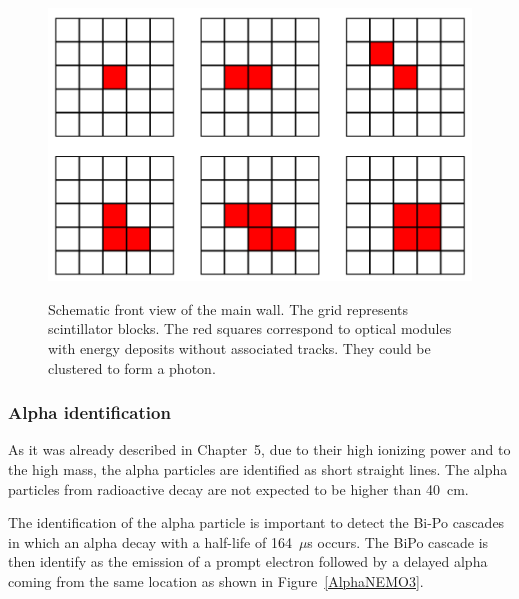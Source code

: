 \documentclass[main.tex]{subfiles}
\begin{document}
\begin{figure}[h!]
\centering
\includegraphics[scale=0.35]{pictures/Chap6/GammaCluster.png}
\label{GammaClusterSchema}
\caption{Schematic front view of the main wall. The grid represents scintillator blocks. The red squares correspond to optical modules with energy deposits without associated tracks. They could be clustered to form a photon.}
\end{figure}

\FloatBarrier

\subsubsection{Alpha identification}


\NI As it was already described in Chapter~5, due to their high ionizing power and to the high mass, the alpha particles are identified as short straight lines. The alpha particles from radioactive decay are not expected to be higher than 40~cm.


\bigskip


\NI The identification of the alpha particle is important to detect the Bi-Po cascades in which an alpha decay with a half-life of 164~$\mu$s occurs. The BiPo cascade is then identify as the emission of a prompt electron followed by a delayed alpha coming from the same location as shown in Figure~\ref{AlphaNEMO3}.  
\end{document}

